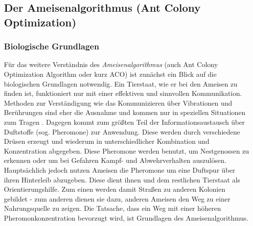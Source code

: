 \documentclass[doktyp=barbeit, sprache=german]{TUBAFarbeiten}
\begin{document}
\subsection{Der Ameisenalgorithmus (Ant Colony Optimization)}
\subsubsection{Biologische Grundlagen}
Für das weitere Verständnis des \textit{Ameisenalgorithmus} (auch Ant Colony Optimization Algorithm oder kurz ACO) ist zunächst ein Blick auf die biologischen Grundlagen notwendig. Ein Tierstaat, wie er bei den Ameisen zu finden ist, funktioniert nur mit einer effektiven und sinnvollen Kommunikation. Methoden zur Verständigung wie das Kommunizieren über Vibrationen und Berührungen sind eher die Ausnahme und kommen nur in speziellen Situationen zum Tragen \cite{Ameisen}. Dagegen kommt zum größten Teil der Informationsaustausch über Duftstoffe (sog. Pheromone) zur Anwendung. Diese werden durch verschiedene Drüsen erzeugt und wiederum in unterschiedlicher Kombination und Konzentration abgegeben.
Diese Pheromone werden benutzt, um Nestgenossen zu erkennen oder um bei Gefahren Kampf- und Abwehrverhalten auszulösen. Hauptsächlich jedoch nutzen Ameisen die Pheromone um eine Duftspur über ihren Hinterleib abzugeben. Diese dient ihnen und dem restlichen Tierstaat als Orientierungshilfe. Zum einen werden damit Straßen zu anderen Kolonien gebildet - zum anderen dienen sie dazu, anderen Ameisen den Weg zu einer Nahrungsquelle zu zeigen. Die Tatsache, dass ein Weg mit einer höheren Pheromonkonzentration bevorzugt wird, ist Grundlagen des Ameisenalgorithmus.
\end{document}
